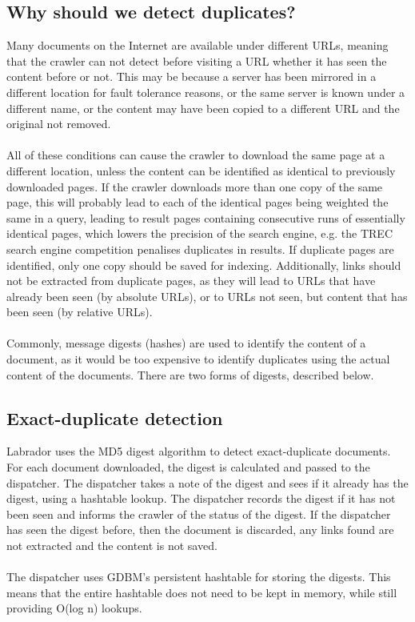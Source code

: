 \subsection{Why should we detect duplicates?}
Many documents on the Internet are available under different URLs, meaning that the crawler can not detect before visiting a URL whether it has seen the content before or not. This may be because a server has been mirrored in a different location for fault tolerance reasons, or the same server is known under a different name, or the content may have been copied to a different URL and the original not removed.\\ \
\\
All of these conditions can cause the crawler to download the same page at a different location, unless the content can be identified as identical to previously downloaded pages. If the crawler downloads more than one copy of the same page, this will probably lead to each of the identical pages being weighted the same in a query, leading to result pages containing consecutive runs of essentially identical pages, which lowers the precision of the search engine, e.g. the TREC search engine competition penalises duplicates in results. If duplicate pages are identified, only one copy should be saved for indexing. Additionally, links should not be extracted from duplicate pages, as they will lead to URLs that have already been seen (by absolute URLs), or to URLs not seen, but content that has been seen (by relative URLs).\\
\ \\
Commonly, message digests (hashes) are used to identify the content of a document, as it would be too expensive to identify duplicates using the actual content of the documents. There are two forms of digests, described below.
\subsection{Exact-duplicate detection}\label{sect-dupdetection}
Labrador uses the MD5 digest algorithm\cite{rfc1321} to detect exact-duplicate documents. For each document downloaded, the digest is calculated and passed to the dispatcher. The dispatcher takes a note of the digest and sees if it already has the digest, using a hashtable lookup. The dispatcher records the digest if it has not been seen and informs the crawler of the status of the digest. If the dispatcher has seen the digest before, then the document is discarded, any links found are not extracted and the content is not saved.\\
\ \\
The dispatcher uses GDBM's persistent hashtable for storing the digests. This means that the entire hashtable does not need to be kept in memory, while still providing O(log n) lookups.
